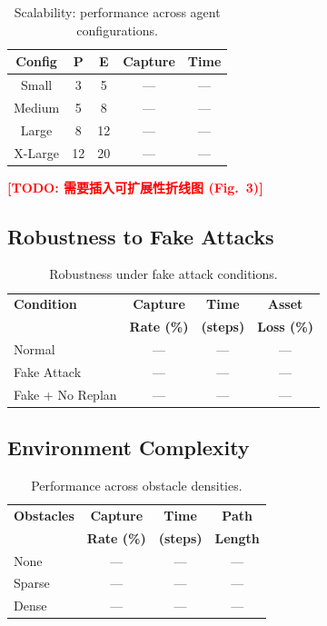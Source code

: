 \documentclass[10pt,conference]{IEEEtran}
\newcommand{\marktodo}[1]{\textcolor{red}{\textbf{[TODO: #1]}}}
\begin{document}
\begin{table}[h]
\centering
\caption{Scalability: performance across agent configurations.}
\label{tab:scalability}
\begin{tabular}{@{}ccccc@{}}
\toprule
\textbf{Config} & \textbf{P} & \textbf{E} & \textbf{Capture} & \textbf{Time} \\
\midrule
Small & 3 & 5 & --- & --- \\
Medium & 5 & 8 & --- & --- \\
Large & 8 & 12 & --- & --- \\
X-Large & 12 & 20 & --- & --- \\
\bottomrule
\end{tabular}
\end{table}

\marktodo{需要插入可扩展性折线图 (Fig.~3)}

\subsection{Robustness to Fake Attacks}

\begin{table}[h]
\centering
\caption{Robustness under fake attack conditions.}
\label{tab:fakeattack}
\begin{tabular}{@{}lccc@{}}
\toprule
\textbf{Condition} & \textbf{Capture} & \textbf{Time} & \textbf{Asset} \\
 & \textbf{Rate (\%)} & \textbf{(steps)} & \textbf{Loss (\%)} \\
\midrule
Normal & --- & --- & --- \\
Fake Attack & --- & --- & --- \\
Fake + No Replan & --- & --- & --- \\
\bottomrule
\end{tabular}
\end{table}

\subsection{Environment Complexity}

\begin{table}[h]
\centering
\caption{Performance across obstacle densities.}
\label{tab:complexity}
\begin{tabular}{@{}lccc@{}}
\toprule
\textbf{Obstacles} & \textbf{Capture} & \textbf{Time} & \textbf{Path} \\
 & \textbf{Rate (\%)} & \textbf{(steps)} & \textbf{Length} \\
\midrule
None & --- & --- & --- \\
Sparse & --- & --- & --- \\
Dense & --- & --- & --- \\
\bottomrule
\end{tabular}
\end{table}
\end{document}
